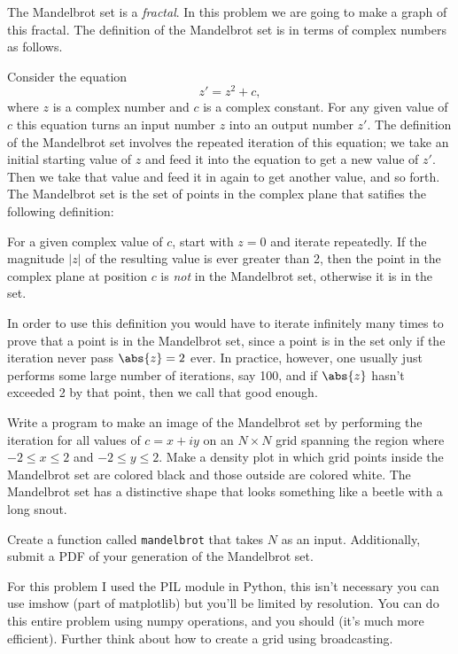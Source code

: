 \documentclass[11pt,letterpaper]{article}
\begin{document}
\begin{problem}
 The Mandelbrot set is a \emph{fractal}. In this problem we are going to make a graph of this 
fractal. The definition of the Mandelbrot set is in terms of complex numbers as follows.

Consider the equation
\[
z'=z^2+c,
\]
where $z$ is a complex number and $c$ is a complex constant. For any given value of $c$ this equation
turns an input number $z$ into an output number $z'$. The definition of the Mandelbrot set involves the
repeated iteration of this equation; we take an initial starting value of $z$ and feed it into the
equation to get a new value of $z'$. Then we take that value and feed it in again to get another 
value, and so forth. The Mandelbrot set is the set of points in the complex plane that satifies
the following definition:


For a given complex value of $c$, start with $z=0$ and iterate repeatedly. If the magnitude 
$\left\vert z\right\vert$ of the resulting value is ever greater than 2, then the point in the
complex plane at position $c$ is \emph{not} in the Mandelbrot set, otherwise it is in the set.


In order to use this definition you would have to iterate infinitely many times to prove that a point
is in the Mandelbrot set, since a point is in the set only if the iteration never pass $\abs{z}=2$
ever. In practice, however, one usually just performs some large number of iterations, say 100, and
if $\abs{z}$ hasn't exceeded 2 by that point, then we call that good enough.

Write a program to make an image of the Mandelbrot set by performing the iteration for all values
of $c=x+iy$ on an $N\times N$ grid spanning the region where $-2\le x\le 2$ and $-2\le y\le 2$. 
Make a density plot in which grid points inside the Mandelbrot set are colored black and those
outside are colored white. The Mandelbrot set has a distinctive shape that looks something like a beetle
with a long snout.

Create a function called \texttt{mandelbrot} that takes $N$ as an input. Additionally, submit a PDF
of your generation of the Mandelbrot set.


For this problem I used the PIL module in Python, this isn't necessary you can use imshow (part of matplotlib) but you'll be limited by resolution. You can do this entire problem using numpy operations, and you should (it's much more efficient). Further think about how to create a grid using broadcasting.
\end{problem}
\end{document}
